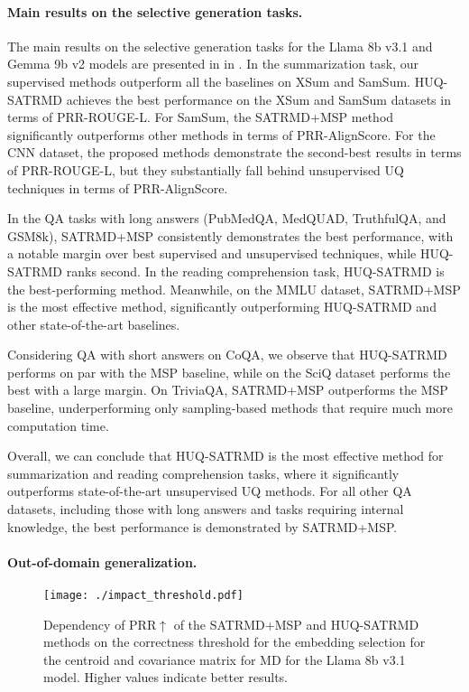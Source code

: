 \documentclass[11pt]{article}
\begin{document}
\paragraph{Main results on the selective generation tasks.}
  The main results on the selective generation tasks for the Llama 8b v3.1 and Gemma 9b v2 models are presented in  in . In the summarization task, our supervised methods outperform all the baselines on XSum and SamSum.
  HUQ-SATRMD achieves the best performance on the XSum and SamSum datasets in terms of PRR-ROUGE-L. For SamSum, the SATRMD+MSP method significantly outperforms other methods in terms of PRR-AlignScore. For the CNN dataset, the proposed methods demonstrate the second-best results in terms of PRR-ROUGE-L, but they substantially fall behind unsupervised UQ techniques in terms of PRR-AlignScore.

  In the QA tasks with long answers (PubMedQA, MedQUAD, TruthfulQA, and GSM8k), SATRMD+MSP consistently demonstrates the best performance, with a notable margin over best supervised and unsupervised techniques, while HUQ-SATRMD ranks second. In the reading comprehension task, HUQ-SATRMD is the best-performing method. Meanwhile, on the MMLU dataset, SATRMD+MSP is the most effective method, significantly outperforming HUQ-SATRMD and other state-of-the-art baselines.

  Considering QA with short answers on CoQA, we observe that HUQ-SATRMD performs on par with the MSP baseline, while on the SciQ dataset performs the best with a large margin. On TriviaQA, SATRMD+MSP outperforms the MSP baseline, underperforming only sampling-based methods that require much more computation time. 

  Overall, we can conclude that HUQ-SATRMD is the most effective method for summarization and reading comprehension tasks, where it significantly outperforms state-of-the-art unsupervised UQ methods. For all other QA datasets, including those with long answers and tasks requiring internal knowledge, the best performance is demonstrated by SATRMD+MSP.

\paragraph{Out-of-domain generalization.}
  

    \begin{figure*}[t!]
    \centering
    \texttt{[image: ./impact\_threshold.pdf]}
    \caption{
    Dependency of PRR$\uparrow$ of the SATRMD+MSP and HUQ-SATRMD methods on the correctness threshold for the embedding selection for the centroid and covariance matrix for MD for the Llama 8b v3.1 model. Higher values indicate better results.
    }
    \label{fig:tmd_threshold}
  \end{figure*}
\end{document}
